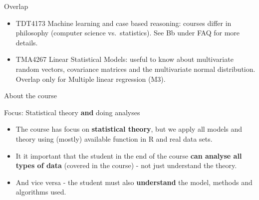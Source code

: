 \documentclass[10pt,ignorenonframetext,]{beamer}
\begin{document}
\begin{frame}

\begin{block}{Overlap}

\begin{itemize}
\item
  TDT4173 Machine learning and case based reasoning: courses differ in
  philosophy (computer science vs.~statistics). See Bb under FAQ for
  more details.
\item
  TMA4267 Linear Statistical Models: useful to know about multivariate
  random vectors, covariance matrices and the multivariate normal
  distribution. Overlap only for Multiple linear regression (M3).
\end{itemize}

\end{block}

\end{frame}

\begin{frame}{About the course}

\begin{block}{Focus: Statistical theory \textbf{and} doing analyses}

\begin{itemize}
\item
  The course has focus on \textbf{statistical theory}, but we apply all
  models and theory using (mostly) available function in R and real data
  sets.
\item
  It it important that the student in the end of the course \textbf{can
  analyse all types of data} (covered in the course) - not just
  understand the theory.
\item
  And vice versa - the student must also \textbf{understand} the model,
  methods and algorithms used.
\end{itemize}

\end{block}

\end{frame}
\end{document}
